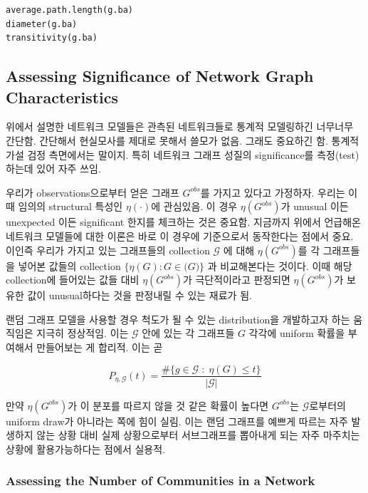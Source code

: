 \documentclass[
]{book}
\begin{document}
{{{\begin{verbatim}
average.path.length(g.ba)
diameter(g.ba)
transitivity(g.ba)
\end{verbatim}

\hypertarget{assessing-significance-of-network-graph-characteristics}{%
\subsection{Assessing Significance of Network Graph Characteristics}\label{assessing-significance-of-network-graph-characteristics}}

위에서 설명한 네트워크 모델들은 관측된 네트워크들로 통계적 모델링하긴 너무너무 간단함. 간단해서 현실모사를 제대로 못해서 쓸모가 없음. 그래도 중요하긴 함. 통계적 가설 검정 측면에서는 말이지. 특히 네트워크 그래프 성질의 significance를 측정(test)하는데 있어 자주 쓰임.

우리가 observations으로부터 얻은 그래프 \(G^{obs}\)를 가지고 있다고 가정하자. 우리는 이때 임의의 structural 특성인 \(\eta(\cdot)\)에 관심있음. 이 경우 \(\eta(G^{obs})\)가 unusual 이든 unexpected 이든 significant 한지를 체크하는 것은 중요함. 지금까지 위에서 언급해온 네트워크 모델들에 대한 이론은 바로 이 경우에 기준으로서 동작한다는 점에서 중요. 이인즉 우리가 가지고 있는 그래프들의 collection \(\mathcal G\) 에 대해 \(\eta(G^{obs})\)를 각 그래프들을 넣어본 값들의 collection \(\{ \eta(G): G \in \mathcal(G)\}\) 과 비교해본다는 것이다. 이때 해당 collection에 들어있는 값들 대비 \(\eta(G^{obs})\)가 극단적이라고 판정되면 \(\eta(G^{obs})\)가 보유한 값이 unusual하다는 것을 판정내릴 수 있는 재료가 됨.

랜덤 그래프 모델을 사용할 경우 척도가 될 수 있는 distribution을 개발하고자 하는 움직임은 지극히 정상적임. 이는 \(\mathcal G\) 안에 있는 각 그래프들 \(G\) 각각에 uniform 확률을 부여해서 만들어보는 게 합리적. 이는 곧

\[
P_{\eta, \mathcal G} (t) = \frac{\text{#}\{ g \in \mathcal G \; : \; \eta(G) \le t \}}{| \mathcal G |}
\]

만약 \(\eta(G^{obs})\)가 이 분포를 따르지 않을 것 같은 확률이 높다면 \(G^{obs}\)는 \(\mathcal G\)로부터의 uniform draw가 아니라는 쪽에 힘이 실림. 이는 랜덤 그래프를 예쁘게 따르는 자주 발생하지 않는 상황 대비 실제 상황으로부터 서브그래프를 뽑아내게 되는 자주 마주치는 상황에 활용가능하다는 점에서 실용적.

\hypertarget{assessing-the-number-of-communities-in-a-network}{%
\subsubsection{Assessing the Number of Communities in a Network}\label{assessing-the-number-of-communities-in-a-network}}

}}}
\end{document}
